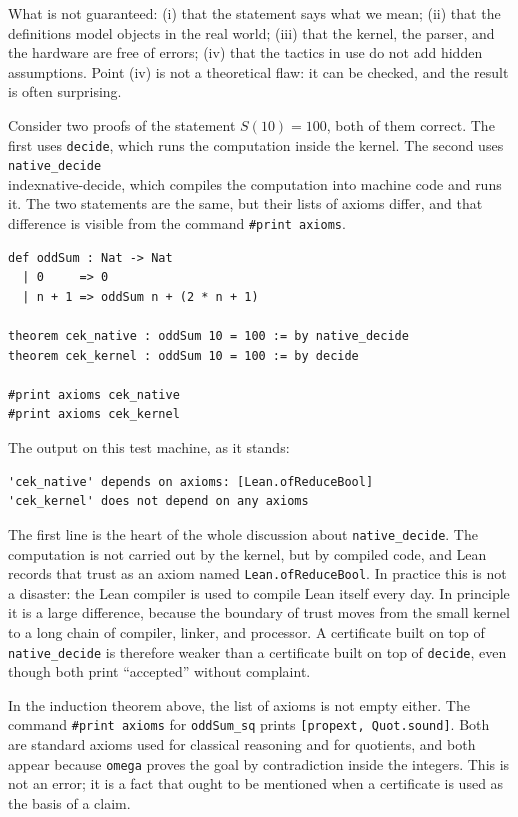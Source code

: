 What is not guaranteed: (i) that the statement says what we mean; (ii) that the definitions model
objects in the real world; (iii) that the kernel, the parser, and the hardware are free of errors;
(iv) that the tactics in use do not add hidden assumptions. Point (iv) is not a theoretical flaw: it
can be checked, and the result is often surprising.

\begin{contoh}
Consider two proofs of the statement $S(10)=100$, both of them correct. The first uses
\texttt{decide}, which runs the computation inside the kernel. The second uses
\texttt{native\_decide}\\index{native-decide}, which compiles the computation into machine code and
runs it. The two statements are the same, but their lists of axioms differ, and that difference is
visible from the command \texttt{\#print axioms}.
\end{contoh}

\begin{verbatim}
def oddSum : Nat -> Nat
  | 0     => 0
  | n + 1 => oddSum n + (2 * n + 1)

theorem cek_native : oddSum 10 = 100 := by native_decide
theorem cek_kernel : oddSum 10 = 100 := by decide

#print axioms cek_native
#print axioms cek_kernel
\end{verbatim}

The output on this test machine, as it stands:

\begin{verbatim}
'cek_native' depends on axioms: [Lean.ofReduceBool]
'cek_kernel' does not depend on any axioms
\end{verbatim}

The first line is the heart of the whole discussion about \texttt{native\_decide}. The computation
is not carried out by the kernel, but by compiled code, and Lean records that trust as an axiom
named \texttt{Lean.ofReduceBool}. In practice this is not a disaster: the Lean compiler is used to
compile Lean itself every day. In principle it is a large difference, because the boundary of trust
moves from the small kernel to a long chain of compiler, linker, and processor. A certificate built
on top of \texttt{native\_decide} is therefore weaker than a certificate built on top of
\texttt{decide}, even though both print ``accepted'' without complaint.

In the induction theorem above, the list of axioms is not empty either. The command
\texttt{\#print axioms} for \texttt{oddSum\_sq} prints \texttt{[propext, Quot.sound]}. Both are
standard axioms used for classical reasoning and for quotients, and both appear because
\texttt{omega} proves the goal by contradiction inside the integers. This is not an error; it is a
fact that ought to be mentioned when a certificate is used as the basis of a claim.

